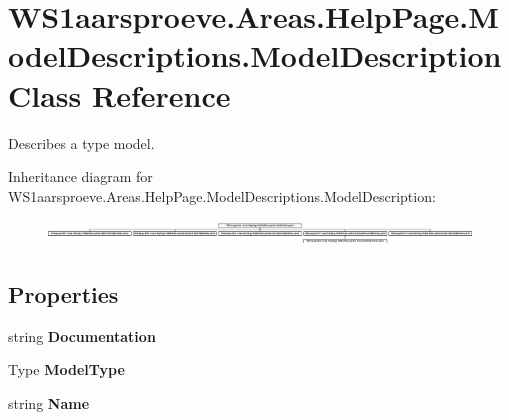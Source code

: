 \hypertarget{class_w_s1aarsproeve_1_1_areas_1_1_help_page_1_1_model_descriptions_1_1_model_description}{}\section{W\+S1aarsproeve.\+Areas.\+Help\+Page.\+Model\+Descriptions.\+Model\+Description Class Reference}
\label{class_w_s1aarsproeve_1_1_areas_1_1_help_page_1_1_model_descriptions_1_1_model_description}


Describes a type model.  


Inheritance diagram for W\+S1aarsproeve.\+Areas.\+Help\+Page.\+Model\+Descriptions.\+Model\+Description\+:\begin{figure}[H]
\begin{center}
\leavevmode
\includegraphics[height=0.674699cm]{class_w_s1aarsproeve_1_1_areas_1_1_help_page_1_1_model_descriptions_1_1_model_description}
\end{center}
\end{figure}
\subsection*{Properties}
\begin{DoxyCompactItemize}
\item 
\hypertarget{class_w_s1aarsproeve_1_1_areas_1_1_help_page_1_1_model_descriptions_1_1_model_description_a98dc32dda32bba913853ee8c8b6327ba}{}string {\bfseries Documentation}\label{class_w_s1aarsproeve_1_1_areas_1_1_help_page_1_1_model_descriptions_1_1_model_description_a98dc32dda32bba913853ee8c8b6327ba}

\item 
\hypertarget{class_w_s1aarsproeve_1_1_areas_1_1_help_page_1_1_model_descriptions_1_1_model_description_a8f11cdb0d179908edc797f4d04e96059}{}Type {\bfseries Model\+Type}\label{class_w_s1aarsproeve_1_1_areas_1_1_help_page_1_1_model_descriptions_1_1_model_description_a8f11cdb0d179908edc797f4d04e96059}

\item 
\hypertarget{class_w_s1aarsproeve_1_1_areas_1_1_help_page_1_1_model_descriptions_1_1_model_description_a349c50a983a61d706ffc7a182f65854f}{}string {\bfseries Name}\label{class_w_s1aarsproeve_1_1_areas_1_1_help_page_1_1_model_descriptions_1_1_model_description_a349c50a983a61d706ffc7a182f65854f}

\end{DoxyCompactItemize}


